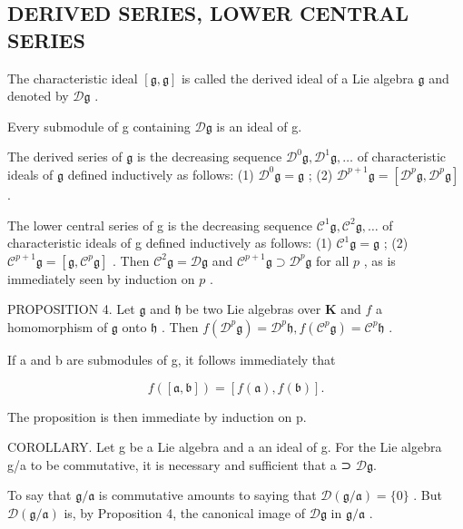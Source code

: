 \subsection{DERIVED SERIES, LOWER CENTRAL SERIES}

The characteristic ideal \([\mathfrak{g},\mathfrak{g}]\) is called the derived ideal of a Lie algebra \(\mathfrak{g}\) and denoted by \(\mathcal{D}\mathfrak{g}\) .

Every submodule of g containing \(\mathcal{D}\mathfrak{g}\) is an ideal of g.

The derived series of \(\mathfrak{g}\) is the decreasing sequence \(\mathcal{D}^0\mathfrak{g},\mathcal{D}^1\mathfrak{g},\ldots\) of characteristic ideals of \(\mathfrak{g}\) defined inductively as follows: (1) \(\mathcal{D}^0\mathfrak{g} = \mathfrak{g}\) ; (2) \(\mathcal{D}^{p + 1}\mathfrak{g} = [\mathcal{D}^p\mathfrak{g},\mathcal{D}^p\mathfrak{g}]\) .

The lower central series of g is the decreasing sequence \(\mathcal{C}^1\mathfrak{g},\mathcal{C}^2\mathfrak{g},\ldots\) of characteristic ideals of g defined inductively as follows: (1) \(\mathcal{C}^1\mathfrak{g} = \mathfrak{g}\) ; (2) \(\mathcal{C}^{p + 1}\mathfrak{g} = [\mathfrak{g},\mathcal{C}^p\mathfrak{g}]\) . Then \(\mathcal{C}^2\mathfrak{g} = \mathcal{D}\mathfrak{g}\) and \(\mathcal{C}^{p + 1}\mathfrak{g}\supset \mathcal{D}^{p}\mathfrak{g}\) for all \(p\) , as is immediately seen by induction on \(p\) .

PROPOSITION 4. Let \(\mathfrak{g}\) and \(\mathfrak{h}\) be two Lie algebras over \(\mathbf{K}\) and \(f\) a homomorphism of \(\mathfrak{g}\) onto \(\mathfrak{h}\) . Then \(f(\mathcal{D}^p\mathfrak{g}) = \mathcal{D}^{p}\mathfrak{h}, f(\mathcal{C}^p\mathfrak{g}) = \mathcal{C}^{p}\mathfrak{h}\) .

If a and b are submodules of g, it follows immediately that

\[
f ([ \mathfrak {a}, \mathfrak {b} ]) = [ f (\mathfrak {a}), f (\mathfrak {b}) ].
\]

The proposition is then immediate by induction on p.

COROLLARY. Let g be a Lie algebra and a an ideal of g. For the Lie algebra g/a to be commutative, it is necessary and sufficient that a ⊃ \(\mathcal{D}\mathfrak{g}\).

To say that \(\mathfrak{g} / \mathfrak{a}\) is commutative amounts to saying that \(\mathcal{D}(\mathfrak{g} / \mathfrak{a}) = \{0\}\) . But \(\mathcal{D}(\mathfrak{g} / \mathfrak{a})\) is, by Proposition 4, the canonical image of \(\mathcal{D}\mathfrak{g}\) in \(\mathfrak{g} / \mathfrak{a}\) .

